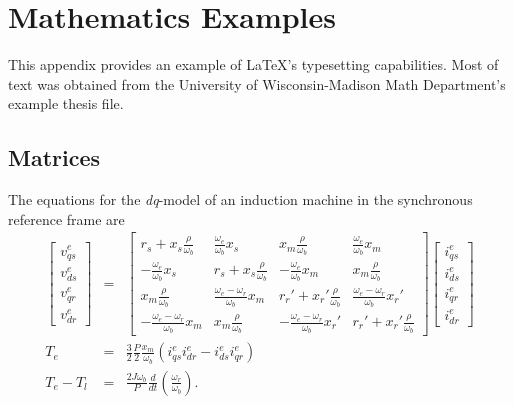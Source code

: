 \chapter{Mathematics Examples}
This appendix provides an example of \LaTeX's typesetting
capabilities.  Most of text was obtained from the University of
Wisconsin-Madison Math Department's example thesis file.

\section{Matrices}
The equations for the {\em dq}-model of an induction machine in the
synchronous reference frame are
\begin{eqnarray}
 \left[\begin{array}{c} v_{qs}^e\\v_{ds}^e\\v_{qr}^e\\v_{dr}^e  \end{array}\right]                                                                                                                                                                                                                                                                                                                                                                                                                                                                                                              
 &=& \left[ \begin{array}{cccc}
 r_s + x_s\frac{\rho}{\omega_b} & \frac{\omega_e}{\omega_b}x_s & x_m\frac{\rho}{\omega_b} & \frac{\omega_e}{\omega_b}x_m \\
 -\frac{\omega_e}{\omega_b}x_s & r_s + x_s\frac{\rho}{\omega_b} & -\frac{\omega_e}{\omega_b}x_m & x_m\frac{\rho}{\omega_b} \\
 x_m\frac{\rho}{\omega_b} & \frac{\omega_e -\omega_r}{\omega_b}x_m & r_r'+x_r'\frac{\rho}{\omega_b} & \frac{\omega_e - \omega_r}{\omega_b}x_r' \\
 -\frac{\omega_e -\omega_r}{\omega_b}x_m & x_m\frac{\rho}{\omega_b} & -\frac{\omega_e - \omega_r}{\omega_b}x_r' & r_r' + x_r'\frac{\rho}{\omega_b}
 \end{array} \right]
 \left[\begin{array}{c} i_{qs}^e\\i_{ds}^e\\i_{qr}^e\\i_{dr}^e\end{array} \right] \label{volteq}\\
 T_e&=&\frac{3}{2}\frac{P}{2}\frac{x_m}{\omega_b}\left(i_{qs}^ei_{dr}^e - i_{ds}^ei_{qr}^e\right) \label{torqueeq}\\
 T_e-T_l&=&\frac{2J\omega_b}{P}\frac{d}{dt}\left(\frac{\omega_r}{\omega_b}\right) \label{mecheq}.
\end{eqnarray}

